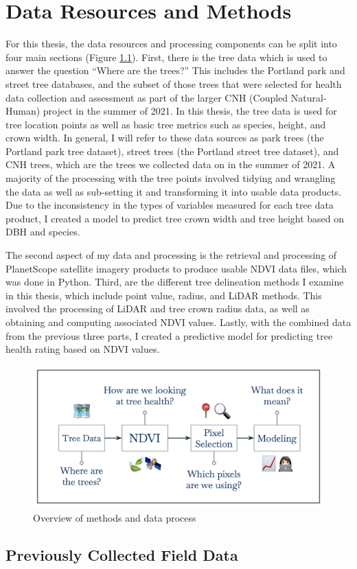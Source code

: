 \documentclass[12pt,twoside]{reedthesis}
\begin{document}
\hypertarget{data-methods}{%
\chapter{Data Resources and Methods}\label{data-methods}}

For this thesis, the data resources and processing components can be
split into four main sections (Figure \ref{fig:methods-overview-fig}).
First, there is the tree data which is used to answer the question
``Where are the trees?'' This includes the Portland park and street tree
databases, and the subset of those trees that were selected for health
data collection and assessment as part of the larger CNH (Coupled
Natural-Human) project in the summer of 2021. In this thesis, the tree
data is used for tree location points as well as basic tree metrics such
as species, height, and crown width. In general, I will refer to these
data sources as park trees (the Portland park tree dataset), street
trees (the Portland street tree dataset), and CNH trees, which are the
trees we collected data on in the summer of 2021. A majority of the
processing with the tree points involved tidying and wrangling the data
as well as sub-setting it and transforming it into usable data products.
Due to the inconsistency in the types of variables measured for each
tree data product, I created a model to predict tree crown width and
tree height based on DBH and species.

The second aspect of my data and processing is the retrieval and
processing of PlanetScope satellite imagery products to produce usable
NDVI data files, which was done in Python. Third, are the different tree
delineation methods I examine in this thesis, which include point value,
radius, and LiDAR methods. This involved the processing of LiDAR and
tree crown radius data, as well as obtaining and computing associated
NDVI values. Lastly, with the combined data from the previous three
parts, I created a predictive model for predicting tree health rating
based on NDVI values.
\begin{figure}

{\centering \includegraphics[width=0.95\linewidth]{figure/methods-overview} 

}

\caption{Overview of methods and data process}\label{fig:methods-overview-fig}
\end{figure}
\hypertarget{previously-collected-field-data}{%
\section{Previously Collected Field Data}\label{previously-collected-field-data}}
\end{document}

